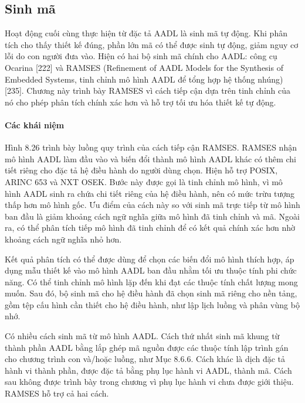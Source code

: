 \subsection{Sinh mã}
Hoạt động cuối cùng thực hiện từ đặc tả AADL là sinh mã tự động. Khi phân tích cho thấy thiết kế đúng, phần lớn mã có thể được sinh tự động, giảm nguy cơ lỗi do con người đưa vào. Hiện có hai bộ sinh mã chính cho AADL: công cụ Ocarina [222] và RAMSES (Refinement of AADL Models for the Synthesis of Embedded Systems, tinh chỉnh mô hình AADL để tổng hợp hệ thống nhúng) [235]. Chương này trình bày RAMSES vì cách tiếp cận dựa trên tinh chỉnh của nó cho phép phân tích chính xác hơn và hỗ trợ tối ưu hóa thiết kế tự động.

\paragraph{Các khái niệm}
Hình 8.26 trình bày luồng quy trình của cách tiếp cận RAMSES. RAMSES nhận mô hình AADL làm đầu vào và biến đổi thành mô hình AADL khác có thêm chi tiết riêng cho đặc tả hệ điều hành do người dùng chọn. Hiện hỗ trợ POSIX, ARINC 653 và NXT OSEK. Bước này được gọi là tinh chỉnh mô hình, vì mô hình AADL sinh ra chứa chi tiết riêng của hệ điều hành, nên có mức trừu tượng thấp hơn mô hình gốc. Ưu điểm của cách này so với sinh mã trực tiếp từ mô hình ban đầu là giảm khoảng cách ngữ nghĩa giữa mô hình đã tinh chỉnh và mã. Ngoài ra, có thể phân tích tiếp mô hình đã tinh chỉnh để có kết quả chính xác hơn nhờ khoảng cách ngữ nghĩa nhỏ hơn.

Kết quả phân tích có thể được dùng để chọn các biến đổi mô hình thích hợp, áp dụng mẫu thiết kế vào mô hình AADL ban đầu nhằm tối ưu thuộc tính phi chức năng. Có thể tinh chỉnh mô hình lặp đến khi đạt các thuộc tính chất lượng mong muốn. Sau đó, bộ sinh mã cho hệ điều hành đã chọn sinh mã riêng cho nền tảng, gồm tệp cấu hình cần thiết cho hệ điều hành, như lập lịch luồng và phân vùng bộ nhớ.

Có nhiều cách sinh mã từ mô hình AADL. Cách thứ nhất sinh mã khung từ thành phần AADL bằng lắp ghép mã nguồn được các thuộc tính lập trình gán cho chương trình con và/hoặc luồng, như Mục 8.6.6. Cách khác là dịch đặc tả hành vi thành phần, được đặc tả bằng phụ lục hành vi AADL, thành mã. Cách sau không được trình bày trong chương vì phụ lục hành vi chưa được giới thiệu. RAMSES hỗ trợ cả hai cách.

